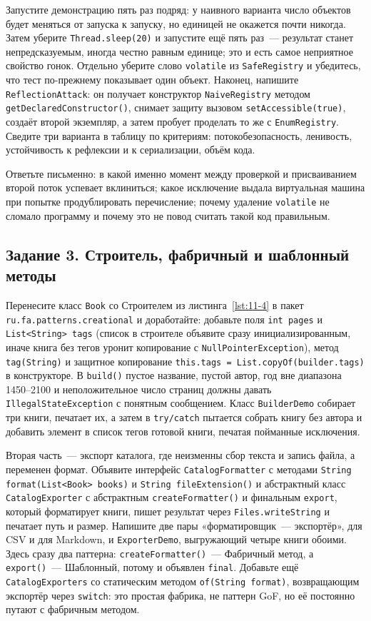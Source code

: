 Запустите демонстрацию пять раз подряд: у наивного варианта число объектов будет
меняться от запуска к запуску, но единицей не окажется почти никогда. Затем
уберите \texttt{Thread.sleep(20)} и запустите ещё пять раз~--- результат станет
непредсказуемым, иногда честно равным единице; это и есть самое неприятное
свойство гонок. Отдельно уберите слово \texttt{volatile} из
\texttt{SafeRegistry} и убедитесь, что тест по-прежнему показывает один объект.
Наконец, напишите \texttt{ReflectionAttack}: он получает конструктор
\texttt{NaiveRegistry} методом \texttt{getDeclaredConstructor()}, снимает защиту
вызовом \texttt{setAccessible(true)}, создаёт второй экземпляр, а затем пробует
проделать то же с \texttt{EnumRegistry}. Сведите три варианта в таблицу по
критериям: потокобезопасность, ленивость, устойчивость к рефлексии и к
сериализации, объём кода.

Ответьте письменно: в какой именно момент между проверкой и присваиванием второй
поток успевает вклиниться; какое исключение выдала виртуальная машина при
попытке продублировать перечисление; почему удаление \texttt{volatile} не
сломало программу и почему это не повод считать такой код правильным.

\subsection*{Задание 3. Строитель, фабричный и шаблонный методы}

Перенесите класс \texttt{Book} со Строителем из листинга~\ref{lst:11-4} в пакет
\texttt{ru.fa.patterns.creational} и доработайте: добавьте поля
\texttt{int pages} и \texttt{List<String> tags} (список в строителе объявите
сразу инициализированным, иначе книга без тегов уронит копирование с
\texttt{NullPointerException}), метод \texttt{tag(String)} и защитное
копирование \texttt{this.tags = List.copyOf(builder.tags)} в конструкторе.
В \texttt{build()} пустое название, пустой автор, год вне диапазона 1450--2100 и
неположительное число страниц должны давать \texttt{IllegalStateException} с
понятным сообщением. Класс \texttt{BuilderDemo} собирает три книги, печатает их,
а затем в \texttt{try/catch} пытается собрать книгу без автора и добавить
элемент в список тегов готовой книги, печатая пойманные исключения.

Вторая часть~--- экспорт каталога, где неизменны сбор текста и запись файла, а
переменен формат. Объявите интерфейс \texttt{CatalogFormatter} с методами
\texttt{String format(List<Book> books)} и \texttt{String fileExtension()} и
абстрактный класс \texttt{CatalogExporter} с абстрактным
\texttt{createFormatter()} и финальным \texttt{export}, который форматирует
книги, пишет результат через \texttt{Files.writeString} и печатает путь и
размер. Напишите две пары «форматировщик~--- экспортёр», для CSV и для Markdown,
и \texttt{ExporterDemo}, выгружающий четыре книги обоими. Здесь сразу два
паттерна: \texttt{createFormatter()}~--- Фабричный метод, а \texttt{export()}~---
Шаблонный, потому и объявлен \texttt{final}. Добавьте ещё
\texttt{CatalogExporters} со статическим методом \texttt{of(String format)},
возвращающим экспортёр через \texttt{switch}: это простая фабрика, не паттерн
GoF, но её постоянно путают с фабричным методом.

